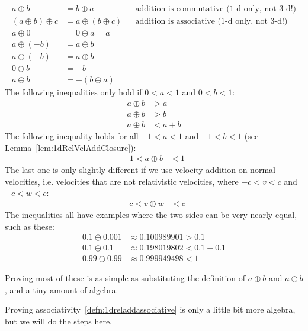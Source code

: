 \documentclass[a4paper]{article}
\theoremstyle{plain}
\theoremstyle{definition}
\begin{document}
\begin{align}
a \oplus b & = b \oplus a & & \text{addition is commutative (1-d only, not 3-d!)} \label{defn:1dreladdcommutative} \\
(a \oplus b) \oplus c & = a \oplus (b \oplus c) & & \text{addition is associative (1-d only, not 3-d!)} \label{defn:1dreladdassociative} \\
a \oplus 0 & = 0 \oplus a = a \\
a \oplus (-b) & = a \ominus b \label{cor:1dRelVelSubSameAsAddingInverse} \\
a \ominus (-b) & = a \oplus b \\
0 \ominus b & = -b \\
a \ominus b & = - (b \ominus a)
\end{align}
The following inequalities only hold if $0 < a < 1$ and $0 < b < 1$:
\begin{align}
a \oplus b & > a \label{inequal:reladdposlarger1} \\
a \oplus b & > b \label{inequal:reladdposlarger2} \\
a \oplus b & < a+b \label{inequal:reladdpossmallerthansum}
\end{align}
The following inequality holds for all $-1 < a < 1$ and $-1 < b < 1$
(see Lemma~\ref{lem:1dRelVelAddClosure}):
\begin{align}
-1 < a \oplus b & < 1 \label{inequal:reladdpossmallerthanc}
\end{align}
The last one is only slightly different if we use velocity addition on
normal velocities, i.e. velocities that are not relativistic velocities,
where $-c < v < c$ and $-c < w < c$:
\begin{align}
-c < v \oplus w & < c \label{inequal:reladdpossmallerthanc2}
\end{align}
The inequalities all have examples where the two sides can be very
nearly equal, such as these:
\begin{align*}
0.1 \oplus 0.001 & \approx 0.100989901 > 0.1 \\
0.1 \oplus 0.1 & \approx 0.198019802 < 0.1+0.1 \\
0.99 \oplus 0.99 & \approx 0.999949498 < 1
\end{align*}

Proving most of these is as simple as substituting the definition of
$a \oplus b$ and $a \ominus b$, and a tiny amount of algebra.

Proving associativity~\eqref{defn:1dreladdassociative} is only a
little bit more algebra, but we will do the steps here.
\end{document}
